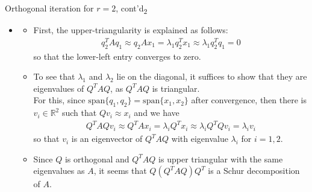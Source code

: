 \documentclass[t,usepdftitle=false]{beamer}
\begin{document}
\begin{frame}{Orthogonal iteration for $r=2$, cont'd\textsubscript{2}}
\begin{itemize}
\item[]
\begin{itemize}
\item[-] First, the upper-triangularity is explained as follows:
\begin{align*}
q_2^TAq_1\approx q_2Ax_1=\lambda_1q_2^Tx_1\approx\lambda_1q_2^Tq_1=0
\end{align*}
so that the lower-left entry converges to zero.\vspace{.1cm}\\
\item[-] To see that $\lambda_1$ and $\lambda_2$ lie on the diagonal, it suffices to show that they are eigenvalues of $Q^TAQ$, as $Q^TAQ$ is triangular.\vspace{.1cm}\\
For this, since $\mathrm{span}\{q_1,q_2\}=\mathrm{span}\{x_1,x_2\}$ after convergence, then there is $v_i\in\mathbb{R}^2$ such that $Qv_i\approx x_i$ and we have
\begin{align*}
Q^TAQv_i\approx Q^TAx_i=\lambda_iQ^Tx_i\approx \lambda_i Q^TQv_i=\lambda_iv_i
\end{align*}
so that $v_i$ is an eigenvector of $Q^TAQ$ with eigenvalue $\lambda_i$ for $i=1,2$.\vspace{.1cm}\\
\item[-] Since $Q$ is orthogonal and $Q^TAQ$ is upper triangular with the same eigenvalues as $A$, it seems that $Q(Q^TAQ)Q^T$ is a Schur decomposition of $A$.
\end{itemize}
\end{itemize}
\end{frame}
\end{document}
